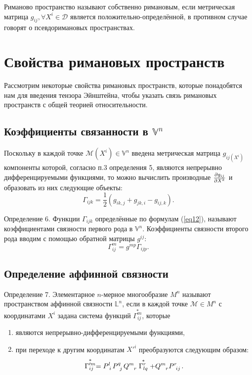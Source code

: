 \documentclass[14pt,a4paper]{scrartcl}
\begin{document}
Риманово пространство называют собственно римановым, если метрическая матрица $g_{ij}, \forall X^i \in \mathcal{D}$ является положительно-определённой, в противном случае говорят о псевдоримановых пространствах.
\\


\section{Свойства римановых пространств}
Рассмотрим некоторые свойства римановых пространств, которые понадобятся нам для введения тензора Эйнштейна, чтобы указать связь римановых пространств с общей теорией относительности.

\subsection{Коэффициенты связанности в $\mathbb{V}^n$}
Поскольку в каждой точке $\mathcal{M}(X^i) \in \mathbb{V}^n$ введена метрическая матрица $g_{ij(X^i)}$ компоненты которой, согласно п.3 определения 5, являются непрерывно дифференцируемыми функциями, то можно вычислить производные $\pdv{g_{ij}}{X^k}$ и образовать из них следующие объекты:
\begin{equation}\label{eq12}
	\Gamma_{ijk} = \frac{1}{2}(g_{ik,j} + g_{jk,i} - g_{ij,k}).
\end{equation}

Определение 6. Функции $\Gamma_{ijk}$ определённые по формулам (\ref{eq12}), называют коэффициентами связности первого рода в $\mathbb{V}^n$. Коэффициенты связности второго рода вводим с помощью обратной матрицы $g^{ij}$:
\begin{equation}\label{eq13}
	\Gamma_{ij}^m = g^{mp}\Gamma_{ijp}.
\end{equation}


\subsection{Определение аффинной связности}
Определение 7. Элементарное $n$-мерное многообразие $M^n$ называют пространством аффинной связности $\mathbb{L}^n$, если в каждой точке $\mathcal{M} \in M^n$ с координатами $X^i$ задана система функций $\overset{*}{\Gamma_{ij}^m}$, которые
\begin{enumerate}
	\item являются непрерывно-дифференцируемыми функциями,
	\item при переходе к другим координатам $X'^i$ преобразуются следующим образом:
	\begin{equation}\label{eq14}
		\stackrel{*}{\Gamma_{ij}^{\prime m}}=P\indices{^{l}_{i}} P\indices{^{q}_{j}} Q\indices{^{m}_{r}} \stackrel{*}{\Gamma_{lq}^{r}}+Q\indices{^{m}_{r}} P\indices{^{r}_{i j}}.
	\end{equation}
\end{enumerate}
\end{document}
